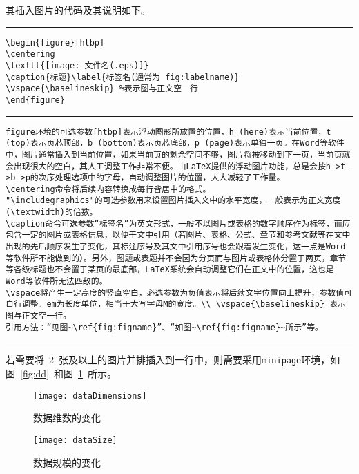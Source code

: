 其插入图片的代码及其说明如下。
\vspace{1em}\noindent\hrule
\begin{verbatim}
\begin{figure}[htbp]
\centering
\texttt{[image: 文件名(.eps)]}
\caption{标题}\label{标签名(通常为 fig:labelname)}
\vspace{\baselineskip} %表示图与正文空一行
\end{figure}
\end{verbatim}

\noindent\hrule

\begin{verbatim}
figure环境的可选参数[htbp]表示浮动图形所放置的位置，h (here)表示当前位置，t (top)表示页芯顶部，b (bottom)表示页芯底部，p (page)表示单独一页。在Word等软件中，图片通常插入到当前位置，如果当前页的剩余空间不够，图片将被移动到下一页，当前页就会出现很大的空白，其人工调整工作非常不便。由LaTeX提供的浮动图片功能，总是会按h->t->b->p的次序处理选项中的字母，自动调整图片的位置，大大减轻了工作量。
\centering命令将后续内容转换成每行皆居中的格式。
"\includegraphics"的可选参数用来设置图片插入文中的水平宽度，一般表示为正文宽度(\textwidth)的倍数。
\caption命令可选参数“标签名”为英文形式，一般不以图片或表格的数字顺序作为标签，而应包含一定的图片或表格信息，以便于文中引用（若图片、表格、公式、章节和参考文献等在文中出现的先后顺序发生了变化，其标注序号及其文中引用序号也会跟着发生变化，这一点是Word等软件所不能做到的）。另外，图题或表题并不会因为分页而与图片或表格体分置于两页，章节等各级标题也不会置于某页的最底部，LaTeX系统会自动调整它们在正文中的位置，这也是Word等软件所无法匹敌的。
\vspace将产生一定高度的竖直空白，必选参数为负值表示将后续文字位置向上提升，参数值可自行调整。em为长度单位，相当于大写字母M的宽度。\\ \vspace{\baselineskip} 表示图与正文空一行。
引用方法：“见图~\ref{fig:figname}”、“如图~\ref{fig:figname}~所示”等。
\end{verbatim}

\noindent\hrule\vspace{1em}

若需要将~2~张及以上的图片并排插入到一行中，则需要采用\verb|minipage|环境，如图~\ref{fig:dd}~和图~\ref{fig:ds}~所示。
\begin{figure}[htbp]
\centering
\begin{minipage}{0.4\textwidth}
\centering
\texttt{[image: dataDimensions]}
\caption{数据维数的变化}\label{fig:dd}
\end{minipage}
\begin{minipage}{0.4\textwidth}
\centering
\texttt{[image: dataSize]}
\caption{数据规模的变化}\label{fig:ds}
\end{minipage}
\vspace{\baselineskip}
\end{figure}

